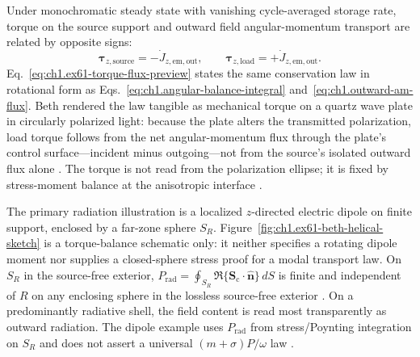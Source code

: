 \FloatBarrier
Under monochromatic steady state with vanishing cycle-averaged storage rate, torque on the source support and outward field angular-momentum transport are related by opposite signs:
\begin{equation}
\label{eq:ch1.ex61-torque-flux-preview}
\boldsymbol{\tau}_{z,\mathrm{source}}=-\dot J_{z,\mathrm{em,out}},
\qquad
\boldsymbol{\tau}_{z,\mathrm{load}}=+\dot J_{z,\mathrm{em,out}}.
\end{equation}
Eq.~\eqref{eq:ch1.ex61-torque-flux-preview} states the same conservation law in rotational form as Eqs.~\eqref{eq:ch1.angular-balance-integral} and~\eqref{eq:ch1.outward-am-flux}. Beth \cite{beth1936} rendered the law tangible as mechanical torque on a quartz wave plate in circularly polarized light: because the plate alters the transmitted polarization, load torque follows from the net angular-momentum flux through the plate's control surface—incident minus outgoing—not from the source's isolated outward flux alone \cite{beth1936,stratton1941}. The torque is not read from the polarization ellipse; it is fixed by stress-moment balance at the anisotropic interface \cite{beth1936,stratton1941}.

The primary radiation illustration is a localized $z$-directed electric dipole on finite support, enclosed by a far-zone sphere $S_R$. Figure~\ref{fig:ch1.ex61-beth-helical-sketch} is a torque-balance schematic only: it neither specifies a rotating dipole moment nor supplies a closed-sphere stress proof for a modal transport law. On $S_R$ in the source-free exterior,
$P_{\mathrm{rad}}=\oint_{S_R}\Re\{\mathbf{S}_\mathrm{c}\cdot\hat{\mathbf{n}}\}\,dS$ is
finite and independent of $R$ on any enclosing sphere in the lossless source-free exterior
\cite{stratton1941,beth1936}. On a predominantly radiative shell, the field content is read most transparently as outward radiation. The dipole example uses $P_{\mathrm{rad}}$ from stress/Poynting integration on $S_R$ and does not assert a universal $(m+\sigma)P/\omega$ law \cite{stratton1941}.

